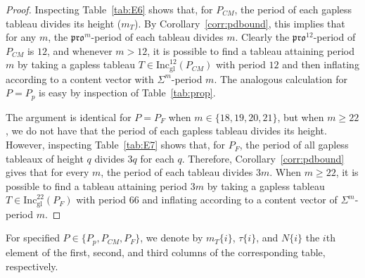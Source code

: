 \documentclass[12pt]{amsart}
\theoremstyle{definition}
\theoremstyle{remark}
\numberwithin{equation}{section}
\newcommand{\inc}{\ensuremath{\mathrm{Inc}}}
\newcommand{\incgl}{\inc_{\mathrm{gl}}}
\newcommand{\pro}{\mathfrak{pro}}
\begin{document}
\begin{proof}
Inspecting Table~\ref{tab:E6} shows that, for $P_{CM}$, the period of each gapless tableau  divides its height ($m_T$). By Corollary~\ref{corr:pdbound}, this implies that for any $m$, the $\pro^m$-period of each tableau divides $m$. Clearly the $\pro^{12}$-period of $P_{CM}$ is $12$, and whenever $m> 12$, it is possible to find a tableau attaining period $m$ by taking a gapless tableau $T \in \incgl^{12}(P_{CM})$ with period $12$ and then inflating according to a content vector with $\Sigma^m$-period $m$. The analogous calculation for $P = P_p$ is easy by inspection of Table~\ref{tab:prop}.

The argument is identical for $P = P_F$ when $m \in \lbrace 18,19,20, 21 \rbrace$, but when $m \geq 22$, we do not have that the period of each gapless tableau divides its height. However, inspecting Table~\ref{tab:E7} shows that, for $P_F$, the period of all gapless tableaux of height $q$ divides $3q$ for each $q$. Therefore, Corollary~\ref{corr:pdbound} gives that for every $m$, the period of each tableau divides $3m$. When $m \geq 22$, it is possible to find a tableau attaining period $3m$ by taking a gapless tableau  $T \in \incgl^{22}(P_F)$ with period $66$ and inflating according to a content vector of $\Sigma^m$-period $m$.


\end{proof}


For specified $P \in \{P_p, P_{CM}, P_F\}$, we denote by $m_T\{i\}$, $\tau\{i\}$, and $N\{i\}$ the $i$th element of the first, second, and third columns of the corresponding table, respectively. 
\\
\end{document}
